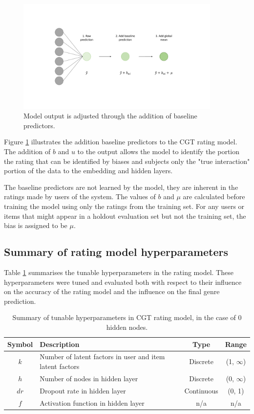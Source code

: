 \begin{figure}[H]
\centering
\includegraphics[width=0.9\textwidth]{Figures/4_CGT-output-layer.pdf}
\decoRule
\caption[Rating layer]{Model output is adjusted through the addition of baseline predictors.}
\label{fig:4_CGT-rating-layer}
\end{figure}

Figure \ref{fig:4_CGT-rating-layer} illustrates the addition baseline predictors to the CGT rating model. The addition of $b$ and $u$ to the output allows the model to identify the portion the rating that can be identified by biases and subjects only the "true interaction" portion of the data to the embedding and hidden layers.

The baseline predictors are not learned by the model, they are inherent in the ratings made by users of the system. The values of $b$ and $\mu$ are calculated before training the model using only the ratings from the training set. For any users or items that might appear in a holdout evaluation set but not the training set, the bias is assigned to be $\mu$.

\subsection{Summary of rating model hyperparameters}
Table \ref{tab:rating-hparams} summarises the tunable hyperparameters in the rating model. These hyperparameters were tuned and evaluated both with respect to their influence on the accuracy of the  rating model and the influence on the final genre prediction.
\begin{table}[H]
\centering
\begin{tabular}{c | p{3.5cm} | c | c}
\toprule
\textbf{Symbol} & \textbf{Description} & \textbf{Type} & \textbf{Range} \\
\midrule
$k$ & Number of latent factors in user and item latent factors & Discrete & (1, $\infty$) \\
\midrule
$h$ & Number of nodes in hidden layer & Discrete & (0, $\infty$) \\
\midrule
$dr$ & Dropout rate in hidden layer & Continuous & (0, 1) \\
\midrule
$f$ & Activation function in hidden layer & n/a & n/a \\
\bottomrule
\end{tabular}
\caption[Rating model hyperparameters]{Summary of tunable hyperparameters in CGT rating model, in the case of 0 hidden nodes.}
\label{tab:rating-hparams}
\end{table}

